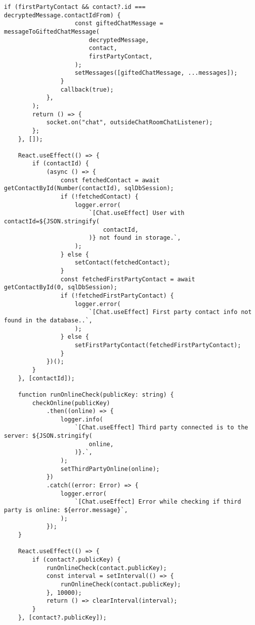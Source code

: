 \documentclass[../main.tex]{subfiles}
\begin{document}
\begin{lstlisting}[caption={Implementacja ekranu czatu},label={lst:js_chat_screen}]
                if (firstPartyContact && contact?.id === decryptedMessage.contactIdFrom) {
                    const giftedChatMessage = messageToGiftedChatMessage(
                        decryptedMessage,
                        contact,
                        firstPartyContact,
                    );
                    setMessages([giftedChatMessage, ...messages]);
                }
                callback(true);
            },
        );
        return () => {
            socket.on("chat", outsideChatRoomChatListener);
        };
    }, []);

    React.useEffect(() => {
        if (contactId) {
            (async () => {
                const fetchedContact = await getContactById(Number(contactId), sqlDbSession);
                if (!fetchedContact) {
                    logger.error(
                        `[Chat.useEffect] User with contactId=${JSON.stringify(
                            contactId,
                        )} not found in storage.`,
                    );
                } else {
                    setContact(fetchedContact);
                }
                const fetchedFirstPartyContact = await getContactById(0, sqlDbSession);
                if (!fetchedFirstPartyContact) {
                    logger.error(
                        `[Chat.useEffect] First party contact info not found in the database..`,
                    );
                } else {
                    setFirstPartyContact(fetchedFirstPartyContact);
                }
            })();
        }
    }, [contactId]);

    function runOnlineCheck(publicKey: string) {
        checkOnline(publicKey)
            .then((online) => {
                logger.info(
                    `[Chat.useEffect] Third party connected is to the server: ${JSON.stringify(
                        online,
                    )}.`,
                );
                setThirdPartyOnline(online);
            })
            .catch((error: Error) => {
                logger.error(
                    `[Chat.useEffect] Error while checking if third party is online: ${error.message}`,
                );
            });
    }

    React.useEffect(() => {
        if (contact?.publicKey) {
            runOnlineCheck(contact.publicKey);
            const interval = setInterval(() => {
                runOnlineCheck(contact.publicKey);
            }, 10000);
            return () => clearInterval(interval);
        }
    }, [contact?.publicKey]);


\end{lstlisting}
\end{document}
